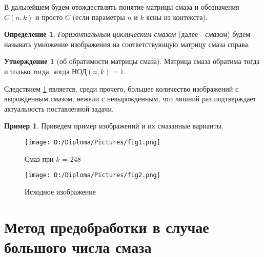 \documentclass[a4paper]{article}
\theoremstyle{definition}
\newtheorem{statement}{Утверждение}[section]
\newtheorem{definition}{Определение}[section]
\newtheorem*{example}{Пример}
\begin{document}
    В дальнейшем будем отождествлять понятие матрицы смаза и обозначения $C(n, k)$ и просто $C$ (если параметры $n$ и $k$ ясны из контекста).
\vspace{0.3cm}


    \begin{definition}
    \label{blur}
	\emph{Горизонтальным циклическим смазом} (далее - \emph{смазом}) будем называть умножение изображения на соответствующую матрицу смаза справа.
    \end{definition}


    \begin{statement}[об обратимости матрицы смаза]
    \label{inverse}
	Матрица смаза обратима тогда и только тогда, когда НОД$(n, k) = 1$.
    \end{statement}


    Следствием \ref{inverse} является, среди прочего, большее количество изображений с вырожденным смазом, нежели с невырожденным, что лишний раз подтверждает актуальность поставленной задачи.

\newpage

    \begin{example}
    Приведем пример изображений и их смазанные варианты.

\begin{minipage}{70mm}
    \begin{figure}[H]
            \texttt{[image: D:/Diploma/Pictures/fig1.png]}
            \label{Fig1}
            \caption[Смаз при $k$ = 248]{Смаз при $k$ = 248}
        \end{figure}
\end{minipage}
\hfill
\begin{minipage}{70mm}
  \begin{figure}[H]
            \texttt{[image: D:/Diploma/Pictures/fig2.png]}
            \label{Fig2}
            \caption[Исходное изображение]{Исходное изображение}
        \end{figure}
\end{minipage}
\hfill

    \end{example}

    \newpage


    \section{Метод предобработки в случае большого числа смаза}
\end{document}
